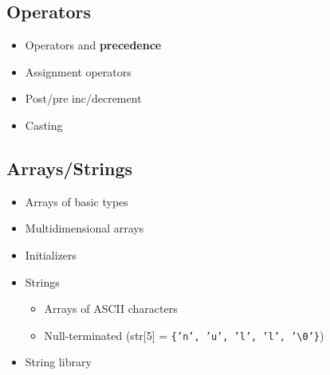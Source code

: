 \documentclass[12pt,a4paper]{article}
\begin{document}
\subsection{Operators}
\begin{itemize}
	\item Operators and \textbf{precedence}
	\item Assignment operators
	\item Post/pre inc/decrement
	\item Casting
\end{itemize}

\subsection{Arrays/Strings}
\begin{itemize}
	\item Arrays of basic types
	\item Multidimensional arrays
	\item Initializers
	\item Strings
	\begin{itemize}
		\item Arrays of ASCII characters
		\item Null-terminated (str[5] = \texttt{\{'n', 'u', 'l', 'l', '\textbackslash 0'\}})
	\end{itemize}
	\item String library
\end{itemize}
\end{document}

